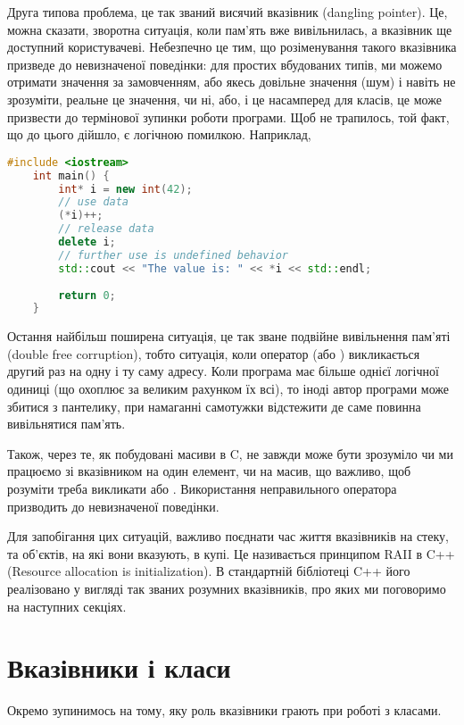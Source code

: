 \documentclass[12pt]{article}
\begin{document}
    Друга типова проблема, це так званий висячий вказівник (dangling pointer). Це, можна сказати, зворотна ситуація, коли пам'ять вже вивільнилась, а вказівник ще доступний користувачеві. Небезпечно це тим, що розіменування такого вказівника призведе до невизначеної поведінки: для простих вбудованих типів, ми можемо отримати значення за замовченням, або якесь довільне значення (шум) і навіть не зрозуміти, реальне це значення, чи ні, або, і це насамперед для класів, це може призвести до термінової зупинки роботи програми. Щоб не трапилось, той факт, що до цього дійшло, є логічною помилкою. Наприклад,
    \begin{lstlisting}[language=c++,label=dangling,caption="Висячий вказівник"]
    #include <iostream>
    int main() {
        int* i = new int(42);
        // use data
        (*i)++;
        // release data
        delete i;
        // further use is undefined behavior
        std::cout << "The value is: " << *i << std::endl;
    
        return 0;
    }
    \end{lstlisting}

    Остання найбільш поширена ситуація, це так зване подвійне вивільнення пам'яті (double free corruption), тобто ситуація, коли оператор  (або ) викликається другий раз на одну і ту саму адресу. Коли програма має більше однієї логічної одиниці (що охоплює за великим рахунком їх всі), то іноді автор програми може збитися з пантелику, при намаганні самотужки відстежити де саме повинна вивільнятися пам'ять.

    Також, через те, як побудовані масиви в C, не завжди може бути зрозуміло чи ми працюємо зі вказівником на один елемент, чи на масив, що важливо, щоб розуміти треба викликати  або . Використання неправильного оператора призводить до невизначеної поведінки.
    
    Для запобігання цих ситуацій, важливо поєднати час життя вказівників на стеку, та об'єктів, на які вони вказують, в купі. Це називається принципом RAII в C++ (Resource allocation is initialization). В стандартній бібліотеці C++ його реалізовано у вигляді так званих розумних вказівників, про яких ми поговоримо на наступних секціях.

    \section{Вказівники і класи}
    Окремо зупинимось на тому, яку роль вказівники грають при роботі з класами.
\end{document}

